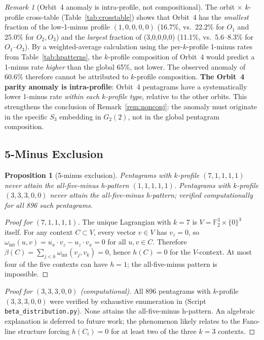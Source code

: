 \documentclass[11pt,a4paper]{article}
\newtheorem{proposition}[theorem]{Proposition}
\theoremstyle{remark}
\newtheorem{remark}[theorem]{Remark}
\begin{document}
\begin{remark}[Orbit~4 anomaly is intra-profile, not compositional]
\label{rem:orbit4-intraprofile}
The orbit $\times$ $k$-profile cross-table (Table~\ref{tab:crosstable}) shows
that Orbit~4 has the \emph{smallest} fraction of the low-1-minus profile
$(1,0,0,0,0)$ (16.7\%, vs.\ 22.2\% for $O_1$ and 25.0\% for $O_2, O_3$)
and the \emph{largest} fraction of (3,0,0,0,0) (11.1\%, vs.\ 5.6--8.3\%
for $O_1$--$O_3$).
By a weighted-average calculation using the per-$k$-profile 1-minus rates
from Table~\ref{tab:hpatterns}, the $k$-profile composition of Orbit~4 would
predict a 1-minus rate \emph{higher} than the global 65\%, not lower.
The observed anomaly of 60.6\% therefore cannot be attributed to
$k$-profile composition.
\textbf{The Orbit~4 parity anomaly is intra-profile}: Orbit~4 pentagrams
have a systematically lower 1-minus rate \emph{within each $k$-profile type},
relative to the other orbits.
This strengthens the conclusion of Remark~\ref{rem:nonconj}: the anomaly
must originate in the specific $S_3$ embedding in $G_2(2)$, not in the
global pentagram composition.
\end{remark}

\subsection{5-Minus Exclusion}

\begin{proposition}[5-minus exclusion]\label{prop:5minus}
Pentagrams with $k$-profile $(7,1,1,1,1)$ never attain the all-five-minus
h-pattern $(1,1,1,1,1)$.
Pentagrams with $k$-profile $(3,3,3,0,0)$ never attain the all-five-minus
h-pattern; verified computationally for all 896 such pentagrams.
\end{proposition}

\begin{proof}[Proof for $(7,1,1,1,1)$]
The unique Lagrangian with $k=7$ is $V = \mathbb{F}_2^3\times\{0\}^3$ itself.
For any context $C \subset V$, every vector $v \in V$ has $v_z = 0$, so
$\omega_{\mathrm{int}}(u,v) = u_x \cdot v_z - u_z \cdot v_x = 0$ for all
$u, v \in C$.
Therefore $\beta(C) = \sum_{j<k}\omega_{\mathrm{int}}(v_j,v_k) = 0$,
hence $h(C) = 0$ for the $V$-context.
At most four of the five contexts can have $h=1$; the all-five-minus pattern
is impossible.
\end{proof}

\begin{proof}[Proof for $(3,3,3,0,0)$ (computational)]
All 896 pentagrams with $k$-profile $(3,3,3,0,0)$ were verified by exhaustive
enumeration in \cite{PaperXIVsuppl} (Script \texttt{beta\_distribution.py}).
None attains the all-five-minus h-pattern.
An algebraic explanation is deferred to future work; the phenomenon likely
relates to the Fano-line structure forcing $h(C_i) = 0$ for at least two
of the three $k=3$ contexts.
\end{proof}
\end{document}
